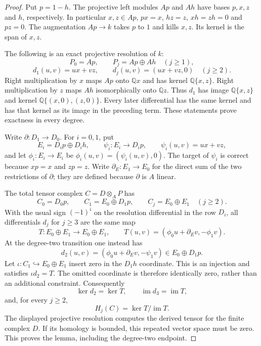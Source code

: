 \begin{proof}
Put $p=1-h$.  The projective left modules $Ap$ and $Ah$ have
bases $p,x,z$ and $h$, respectively.  In particular $x,z\in Ap$,
$px=x$, $hz=z$, $xh=zh=0$ and $pz=0$.
The augmentation $Ap\to k$ takes $p$ to $1$ and kills $x,z$.
Its kernel is the span of $x,z$.

The following is an exact projective resolution of $k$:
\[
 P_0=Ap,\qquad P_j=Ap\oplus Ah\quad(j\ge1),
\]
\[
 d_1(u,v)=ux+vz,\qquad
 d_j(u,v)=(ux+vz,0)\quad(j\ge2).
\]
Right multiplication by $x$ maps $Ap$ onto $\mathbb Qx$ and
has kernel $\mathbb Q\{x,z\}$.  Right multiplication by $z$
maps $Ah$ isomorphically onto $\mathbb Qz$.  Thus $d_1$ has
image $\mathbb Q\{x,z\}$ and kernel
$\mathbb Q\{(x,0),(z,0)\}$.  Every later differential has
the same kernel and has that kernel as its image in the preceding
term.  These statements prove exactness in every degree.

Write $\partial:D_1\to D_0$.  For $i=0,1$, put
\[
 E_i=D_i p\oplus D_i h,\qquad
 \psi_i:E_i\longrightarrow D_i p,\qquad
 \psi_i(u,v)=ux+vz,
\]
and let $\phi_i:E_i\to E_i$ be $\phi_i(u,v)=(\psi_i(u,v),0)$.
The target of $\psi_i$ is correct because $xp=x$ and $zp=z$.
Write $\partial_E:E_1\to E_0$ for the direct sum of the two
restrictions of $\partial$; they are defined because $\partial$
is $A$ linear.

The total tensor complex $C=D\otimes_A P$ has
\[
 C_0=D_0p,\qquad C_1=E_0\oplus D_1p,\qquad
 C_j=E_0\oplus E_1\quad(j\ge2).
\]
With the usual sign $(-1)^i$ on the resolution differential
in the row $D_i$, all differentials $d_j$ for $j\ge3$ are the
same map
\[
 T:E_0\oplus E_1\longrightarrow E_0\oplus E_1,
 \qquad T(u,v)=(\phi_0u+\partial_Ev,-\phi_1v).
\]
At the degree-two transition one instead has
\[
 d_2(u,v)=(\phi_0u+\partial_Ev,-\psi_1v)
       \in E_0\oplus D_1p.
\]
Let $\iota:C_1\hookrightarrow E_0\oplus E_1$ insert zero in
the $D_1h$ coordinate.  This is an injection and satisfies
$\iota d_2=T$.  The omitted coordinate is therefore identically
zero, rather than an additional constraint.  Consequently
\[
 \ker d_2=\ker T,\qquad \operatorname{im}d_3=\operatorname{im}T,
\]
and, for every $j\ge2$,
\[
 H_j(C)=\ker T/\operatorname{im}T.
\]
The displayed projective resolution computes the derived tensor
for the finite complex $D$.  If its homology is bounded, this
repeated vector space must be zero.  This proves the lemma,
including the degree-two endpoint.
\end{proof}

